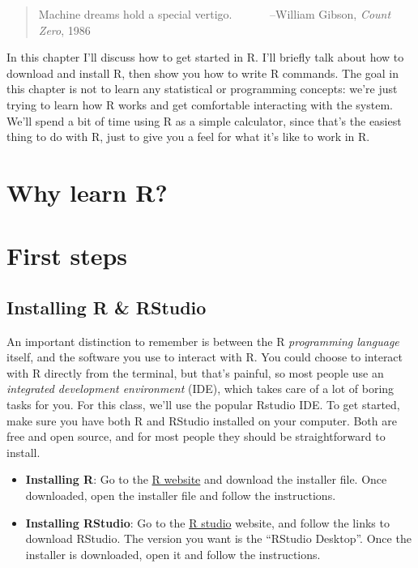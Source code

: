 \documentclass[]{book}
\begin{document}
\begin{quote}
Machine dreams hold a special vertigo.
~~~~~~--William Gibson, \emph{Count Zero}, 1986
\end{quote}

In this chapter I'll discuss how to get started in R. I'll briefly talk about how to download and install R, then show you how to write R commands. The goal in this chapter is not to learn any statistical or programming concepts: we're just trying to learn how R works and get comfortable interacting with the system. We'll spend a bit of time using R as a simple calculator, since that's the easiest thing to do with R, just to give you a feel for what it's like to work in R.

\hypertarget{why-learn-r}{%
\section{Why learn R?}\label{why-learn-r}}

\hypertarget{first-steps}{%
\section{First steps}\label{first-steps}}

\hypertarget{installing-r-rstudio}{%
\subsection{Installing R \& RStudio}\label{installing-r-rstudio}}

An important distinction to remember is between the R \emph{programming language} itself, and the software you use to interact with R. You could choose to interact with R directly from the terminal, but that's painful, so most people use an \emph{integrated development environment} (IDE), which takes care of a lot of boring tasks for you. For this class, we'll use the popular Rstudio IDE. To get started, make sure you have both R and RStudio installed on your computer. Both are free and open source, and for most people they should be straightforward to install.

\begin{itemize}
\item
  \textbf{Installing R}: Go to the \href{https://www.r-project.org/}{R website} and download the installer file. Once downloaded, open the installer file and follow the instructions.
\item
  \textbf{Installing RStudio}: Go to the \href{https://www.rstudio.com/}{R studio} website, and follow the links to download RStudio. The version you want is the ``RStudio Desktop''. Once the installer is downloaded, open it and follow the instructions.
\end{itemize}
\end{document}

